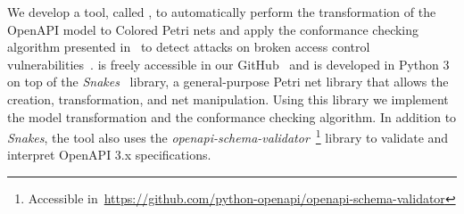 We develop a tool, called {\nameTool}, to automatically perform the transformation of the OpenAPI model to Colored Petri nets and apply the conformance checking algorithm presented in~\cite{carrasquel2020checking} to detect attacks on broken access control vulnerabilities~\cite{AJBC-ICNGIoT-22}. {\nameTool} is freely accessible in our GitHub~\cite{links2cpn} and is developed in Python 3 on top of the \textit{Snakes}~\cite{pommereau2015snakes} library, a general-purpose Petri net library that allows the creation, transformation, and net manipulation. Using this library we implement the model transformation and the conformance checking algorithm. In addition to \textit{Snakes}, the tool also uses the \textit{openapi-schema-validator}~\footnote{Accessible in~\url{https://github.com/python-openapi/openapi-schema-validator}} library to validate and interpret OpenAPI 3.x specifications.

